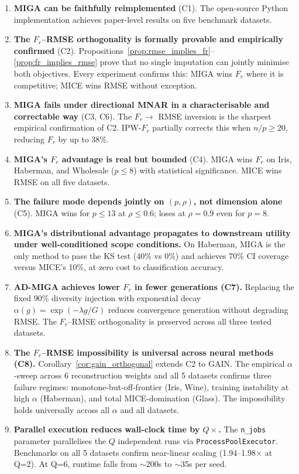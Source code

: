 \begin{enumerate}
    \item \textbf{MIGA can be faithfully reimplemented} (C1). The open-source Python implementation achieves paper-level results on five benchmark datasets.

    \item \textbf{The $F_r$--RMSE orthogonality is formally provable and empirically confirmed} (C2). Propositions~\ref{prop:rmse_implies_fr}--\ref{prop:fr_implies_rmse} prove that no single imputation can jointly minimise both objectives. Every experiment confirms this: MIGA wins $F_r$ where it is competitive; MICE wins RMSE without exception.

    \item \textbf{MIGA fails under directional MNAR in a characterisable and correctable way} (C3, C6). The $F_r \to$ RMSE inversion is the sharpest empirical confirmation of C2. IPW-$F_r$ partially corrects this when $n/p \geq 20$, reducing $F_r$ by up to 38\%.

    \item \textbf{MIGA's $F_r$ advantage is real but bounded} (C4). MIGA wins $F_r$ on Iris, Haberman, and Wholesale ($p \leq 8$) with statistical significance. MICE wins RMSE on all five datasets.

    \item \textbf{The failure mode depends jointly on $(p, \rho)$, not dimension alone} (C5). MIGA wins for $p \leq 13$ at $\rho \leq 0.6$; loses at $\rho = 0.9$ even for $p = 8$.

    \item \textbf{MIGA's distributional advantage propagates to downstream utility under well-conditioned scope conditions.} On Haberman, MIGA is the only method to pass the KS test (40\% vs 0\%) and achieves 70\% CI coverage versus MICE's 10\%, at zero cost to classification accuracy.

    \item \textbf{AD-MIGA achieves lower $F_r$ in fewer generations (C7).} Replacing the fixed 90\% diversity injection with exponential decay $\alpha(g) = \exp(-\lambda g/G)$ reduces convergence generation without degrading RMSE. The $F_r$--RMSE orthogonality is preserved across all three tested datasets.

    \item \textbf{The $F_r$--RMSE impossibility is universal across neural methods (C8).} Corollary~\ref{cor:gain_orthogonal} extends C2 to GAIN. The empirical $\alpha$-sweep across 6 reconstruction weights and all 5 datasets confirms three failure regimes: monotone-but-off-frontier (Iris, Wine), training instability at high $\alpha$ (Haberman), and total MICE-domination (Glass). The impossibility holds universally across all $\alpha$ and all datasets.

    \item \textbf{Parallel execution reduces wall-clock time by $Q\times$.} The \texttt{n\_jobs} parameter parallelises the $Q$ independent runs via \texttt{ProcessPoolExecutor}. Benchmarks on all 5 datasets confirm near-linear scaling (1.94--1.98$\times$ at Q=2). At Q=6, runtime falls from $\sim$200s to $\sim$35s per seed.
\end{enumerate}

